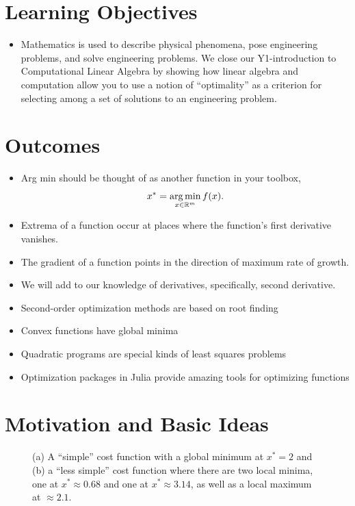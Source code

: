 \section*{Learning Objectives}
\begin{itemize}
\item Mathematics is used to describe physical phenomena, pose engineering problems, and solve engineering problems. We close our Y1-introduction to Computational Linear Algebra by showing how linear algebra and computation allow you to use a notion of ``optimality'' as a criterion for selecting among a set of solutions to an engineering problem. 
\end{itemize}

\section*{Outcomes}
\begin{itemize}
\item Arg min should be thought of as another function in your toolbox,
$$x^\ast = \operatorname*{arg\,min}_{x\in \mathbb R^m} f(x).$$
\item Extrema of a function occur at places where the function's first derivative vanishes.
\item The gradient of a function points in the direction of maximum rate of growth.
\item We will add to our knowledge of derivatives, specifically, second derivative.
\item Second-order optimization methods are based on root finding
\item Convex functions have global minima
\item Quadratic programs are special kinds of least squares problems
\item Optimization packages in Julia provide amazing tools for optimizing functions
\end{itemize}


\vspace*{1.5cm}





\newpage

\section{Motivation and Basic Ideas}

\begin{figure}[thb]%
\centering
{}%
\hspace{5pt}%
%
\caption[]{(a) A ``simple'' cost function with a global minimum at $x^\ast=2$ and (b) a ``less simple'' cost function where there are two local minima, one at $x^\ast\approx 0.68$ and one at $x^\ast\approx 3.14$, as well as a local maximum at $\approx 2.1$.}
    \label{fig:ScalarCosts}
\end{figure}

